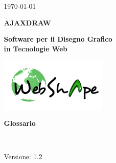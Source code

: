 
\title{\TITOLODOC}
\author{Mirco Geremia}



\renewcommand{\insertversion}{1.2} %
\renewcommand{\TITOLODOC}{Glossario} %
\renewcommand{\glosspath}{.\glossario} %

\begin{titlepage}
\begin{center}
	\begin{Large}	\today \end{Large}
\end{center}

\vspace{20pt}

\begin{center}
	\begin{Huge}
				\textbf{AJAXDRAW}
	\end{Huge}
\end{center}			

\begin{center}
	\begin{large}
				\textbf{Software per il Disegno Grafico\\ in Tecnologie Web}
	\end{large}
\end{center}			

\vspace{20pt}

\begin{center}
\includegraphics[width=150pt]{../logo/logo}
\end{center}

\vspace{170pt}
\begin{center} %
	\begin{Huge}
				\textbf{\TITOLODOC}
	\end{Huge}
			\\
\end{center}
\vspace{200pt}
\begin{center}
Versione: \insertversion
\end{center}
\end{titlepage}

